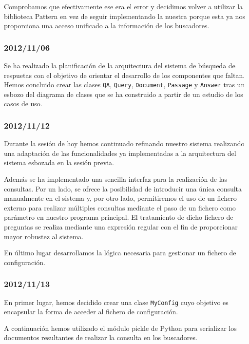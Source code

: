 \documentclass[12pt,a4paper,titlepage]{article}
\begin{document}
Comprobamos que efectivamente ese era el error y decidimos volver a utilizar la biblioteca Pattern en vez de seguir implementando la nuestra porque esta ya nos proporciona una acceso unificado a la información de los buscadores.

\subsubsection*{2012/11/06}
Se ha realizado la planificación de la arquitectura del sistema de búsqueda de respuetas con el objetivo de orientar el desarrollo de los componentes que faltan. Hemos concluido crear las clases \texttt{QA}, \texttt{Query}, \texttt{Document}, \texttt{Passage} y \texttt{Answer} tras un esbozo del diagrama de clases que se ha construido a partir de un estudio de los casos de uso.

\subsubsection*{2012/11/12}
Durante la sesión de hoy hemos continuado refinando nuestro sistema realizando una adaptación de las funcionalidades ya implementadas a la arquitectura del sistema esbozada en la sesión previa.

Además se ha implementado una sencilla interfaz para la realización de las consultas. Por un lado, se ofrece la posibilidad de introducir una única consulta manualmente en el sistema y, por otro lado, permitiremos el uso de un fichero externo para realizar múltiples consultas mediante el paso de un fichero como parámetro en nuestro programa principal. El tratamiento de dicho fichero de preguntas se realiza mediante una expresión regular con el fin de proporcionar mayor robustez al sistema.

En último lugar desarrollamos la lógica necesaria para gestionar un fichero de configuración.

\subsubsection*{2012/11/13}
En primer lugar, hemos decidido crear una clase \texttt{MyConfig} cuyo objetivo es encapsular la forma de acceder al fichero de configuración.

A continuación hemos utilizado el módulo pickle de Python para serializar los documentos resultantes de realizar la consulta en los buscadores.
\end{document}
